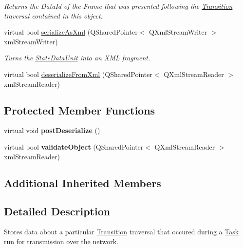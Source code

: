 \begin{DoxyCompactItemize}
\begin{DoxyCompactList}\small\item\em Returns the Data\-Id of the Frame that was presented following the \hyperlink{class_picto_1_1_transition}{Transition} traversal contained in this object. \end{DoxyCompactList}\item 
\hypertarget{class_picto_1_1_state_data_unit_a8259d44bb9364c40c43f040efe64d3a0}{virtual bool \hyperlink{class_picto_1_1_state_data_unit_a8259d44bb9364c40c43f040efe64d3a0}{serialize\-As\-Xml} (Q\-Shared\-Pointer$<$ Q\-Xml\-Stream\-Writer $>$ xml\-Stream\-Writer)}\label{class_picto_1_1_state_data_unit_a8259d44bb9364c40c43f040efe64d3a0}

\begin{DoxyCompactList}\small\item\em Turns the \hyperlink{class_picto_1_1_state_data_unit}{State\-Data\-Unit} into an X\-M\-L fragment. \end{DoxyCompactList}\item 
virtual bool \hyperlink{class_picto_1_1_state_data_unit_aaf856b26ed8bf9e8e499eabbd4a510d9}{deserialize\-From\-Xml} (Q\-Shared\-Pointer$<$ Q\-Xml\-Stream\-Reader $>$ xml\-Stream\-Reader)
\end{DoxyCompactItemize}
\subsection*{Protected Member Functions}
\begin{DoxyCompactItemize}
\item 
\hypertarget{class_picto_1_1_state_data_unit_a46f97fc2c563898fa03539dc1b674633}{virtual void {\bfseries post\-Deserialize} ()}\label{class_picto_1_1_state_data_unit_a46f97fc2c563898fa03539dc1b674633}

\item 
\hypertarget{class_picto_1_1_state_data_unit_aaf249288f61adc57c994044aaa29035f}{virtual bool {\bfseries validate\-Object} (Q\-Shared\-Pointer$<$ Q\-Xml\-Stream\-Reader $>$ xml\-Stream\-Reader)}\label{class_picto_1_1_state_data_unit_aaf249288f61adc57c994044aaa29035f}

\end{DoxyCompactItemize}
\subsection*{Additional Inherited Members}


\subsection{Detailed Description}
Stores data about a particular \hyperlink{class_picto_1_1_transition}{Transition} traversal that occured during a \hyperlink{class_picto_1_1_task}{Task} run for transmission over the network. 

